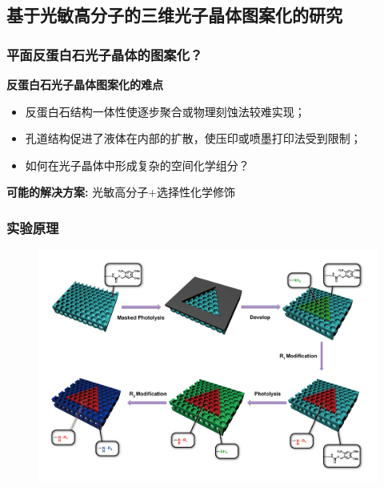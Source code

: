 \documentclass{beamer}
\begin{document}
\subsection{基于光敏高分子的三维光子晶体图案化的研究}
\begin{frame}
  \frametitle{平面反蛋白石光子晶体的图案化？}
  \textcolor{tsinghua}{\textbf{反蛋白石光子晶体图案化的难点}}
  \begin{itemize}[<+-| alert@+>]
    \item
    反蛋白石结构一体性使逐步聚合或物理刻蚀法较难实现；
    \item
    孔道结构促进了液体在内部的扩散，使压印或喷墨打印法受到限制；
    \item
    如何在光子晶体中形成复杂的空间化学组分？
  \end{itemize}
  \pause
  \textcolor{tsinghua}{\textbf{可能的解决方案:}}
  \pause
  光敏高分子+选择性化学修饰
\end{frame}

\begin{frame}
  \frametitle{实验原理}
  \begin{figure}[t]
    \centering
    \includegraphics[width=0.95\linewidth]{figures/scheme-2D.png}
  \end{figure}
\end{frame}
\end{document}

